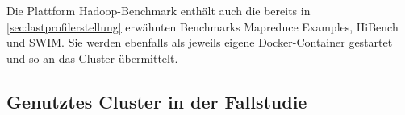 Die Plattform Hadoop-Benchmark enthält auch die bereits in \autoref{sec:lastprofilerstellung} erwähnten Benchmarks Mapreduce Examples, HiBench und SWIM. Sie werden ebenfalls als jeweils eigene Docker-Container gestartet und so an das Cluster übermittelt.

\subsection{Genutztes Cluster in der Fallstudie}\label{sec:clusterFallstudie}

